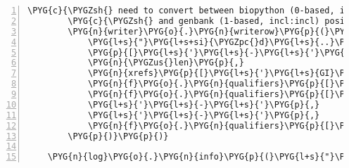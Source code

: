 \begin{Verbatim}[commandchars=\\\{\},numbers=left,firstnumber=1,stepnumber=5]
        \PYG{c}{\PYGZsh{} need to convert between biopython (0-based, incl:excl)}
        \PYG{c}{\PYGZsh{} and genbank (1-based, incl:incl) position boundary notation here}
        \PYG{n}{writer}\PYG{o}{.}\PYG{n}{writerow}\PYG{p}{(}\PYG{p}{(}
            \PYG{l+s}{"}\PYG{l+s+si}{\PYGZpc{}d}\PYG{l+s}{..}\PYG{l+s+si}{\PYGZpc{}d}\PYG{l+s}{"} \PYG{o}{\PYGZpc{}} \PYG{p}{(}\PYG{n}{f}\PYG{o}{.}\PYG{n}{location}\PYG{o}{.}\PYG{n}{start}\PYG{o}{.}\PYG{n}{position}\PYG{o}{+}\PYG{l+m+mi}{1}\PYG{p}{,} \PYG{n}{f}\PYG{o}{.}\PYG{n}{location}\PYG{o}{.}\PYG{n}{end}\PYG{o}{.}\PYG{n}{position}\PYG{p}{)}\PYG{p}{,}
            \PYG{p}{[}\PYG{l+s}{'}\PYG{l+s}{-}\PYG{l+s}{'}\PYG{p}{,} \PYG{l+s}{'}\PYG{l+s}{+}\PYG{l+s}{'}\PYG{p}{]}\PYG{p}{[}\PYG{p}{(}\PYG{n}{f}\PYG{o}{.}\PYG{n}{strand} \PYG{o}{+} \PYG{l+m+mi}{1}\PYG{p}{)} \PYG{o}{/} \PYG{l+m+mi}{2}\PYG{p}{]}\PYG{p}{,}
            \PYG{n}{\PYGZus{}len}\PYG{p}{,}
            \PYG{n}{xrefs}\PYG{p}{[}\PYG{l+s}{'}\PYG{l+s}{GI}\PYG{l+s}{'}\PYG{p}{]}\PYG{p}{,}
            \PYG{n}{f}\PYG{o}{.}\PYG{n}{qualifiers}\PYG{p}{[}\PYG{l+s}{'}\PYG{l+s}{gene}\PYG{l+s}{'}\PYG{p}{]}\PYG{p}{[}\PYG{l+m+mi}{0}\PYG{p}{]}\PYG{p}{,}
            \PYG{n}{f}\PYG{o}{.}\PYG{n}{qualifiers}\PYG{p}{[}\PYG{l+s}{'}\PYG{l+s}{locus\PYGZus{}tag}\PYG{l+s}{'}\PYG{p}{]}\PYG{p}{[}\PYG{l+m+mi}{0}\PYG{p}{]}\PYG{p}{,}
            \PYG{l+s}{'}\PYG{l+s}{-}\PYG{l+s}{'}\PYG{p}{,}
            \PYG{l+s}{'}\PYG{l+s}{-}\PYG{l+s}{'}\PYG{p}{,}
            \PYG{n}{f}\PYG{o}{.}\PYG{n}{qualifiers}\PYG{p}{[}\PYG{l+s}{'}\PYG{l+s}{product}\PYG{l+s}{'}\PYG{p}{]}\PYG{p}{[}\PYG{l+m+mi}{0}\PYG{p}{]}
        \PYG{p}{)}\PYG{p}{)}

    \PYG{n}{log}\PYG{o}{.}\PYG{n}{info}\PYG{p}{(}\PYG{l+s}{"}\PYG{l+s}{wrote }\PYG{l+s+si}{\PYGZpc{}d}\PYG{l+s}{ rows}\PYG{l+s}{"} \PYG{o}{\PYGZpc{}} \PYG{n}{n}\PYG{p}{)}
\end{Verbatim}


